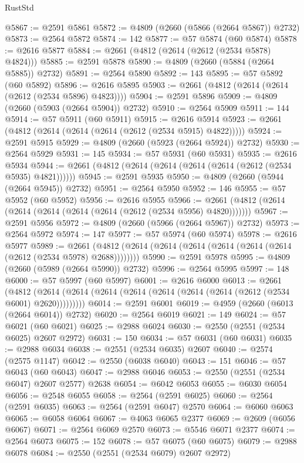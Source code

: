 \begin{lexlean}{RustStd}
\begin{coremodule}
@5867 := @2591 @5861
@5872 := @4809 (@2660 (@5866 (@2664 @5867)) @2732)
@5873 := @2564 @5872
@5874 := 142
@5877 := @57 @5874 (@60 @5874)
@5878 := @2616 @5877
@5884 := @2661 (@4812 (@2614 (@2612 (@2534 @5878) @4824)))
@5885 := @2591 @5878
@5890 := @4809 (@2660 (@5884 (@2664 @5885)) @2732)
@5891 := @2564 @5890
@5892 := 143
@5895 := @57 @5892 (@60 @5892)
@5896 := @2616 @5895
@5903 := @2661 (@4812 (@2614 (@2614 (@2612 (@2534 @5896) @4823))))
@5904 := @2591 @5896
@5909 := @4809 (@2660 (@5903 (@2664 @5904)) @2732)
@5910 := @2564 @5909
@5911 := 144
@5914 := @57 @5911 (@60 @5911)
@5915 := @2616 @5914
@5923 := @2661 (@4812 (@2614 (@2614 (@2614 (@2612 (@2534 @5915) @4822)))))
@5924 := @2591 @5915
@5929 := @4809 (@2660 (@5923 (@2664 @5924)) @2732)
@5930 := @2564 @5929
@5931 := 145
@5934 := @57 @5931 (@60 @5931)
@5935 := @2616 @5934
@5944 := @2661 (@4812 (@2614 (@2614 (@2614 (@2614 (@2612 (@2534 @5935) @4821))))))
@5945 := @2591 @5935
@5950 := @4809 (@2660 (@5944 (@2664 @5945)) @2732)
@5951 := @2564 @5950
@5952 := 146
@5955 := @57 @5952 (@60 @5952)
@5956 := @2616 @5955
@5966 := @2661 (@4812 (@2614 (@2614 (@2614 (@2614 (@2614 (@2612 (@2534 @5956) @4820)))))))
@5967 := @2591 @5956
@5972 := @4809 (@2660 (@5966 (@2664 @5967)) @2732)
@5973 := @2564 @5972
@5974 := 147
@5977 := @57 @5974 (@60 @5974)
@5978 := @2616 @5977
@5989 := @2661 (@4812 (@2614 (@2614 (@2614 (@2614 (@2614 (@2614 (@2612 (@2534 @5978) @2688))))))))
@5990 := @2591 @5978
@5995 := @4809 (@2660 (@5989 (@2664 @5990)) @2732)
@5996 := @2564 @5995
@5997 := 148
@6000 := @57 @5997 (@60 @5997)
@6001 := @2616 @6000
@6013 := @2661
    (@4812 (@2614 (@2614 (@2614 (@2614 (@2614 (@2614 (@2614 (@2612 (@2534 @6001) @2620)))))))))
@6014 := @2591 @6001
@6019 := @4959 (@2660 (@6013 (@2664 @6014)) @2732)
@6020 := @2564 @6019
@6021 := 149
@6024 := @57 @6021 (@60 @6021)
@6025 := @2988 @6024
@6030 := @2550 (@2551 (@2534 @6025) @2607 @2972)
@6031 := 150
@6034 := @57 @6031 (@60 @6031)
@6035 := @2988 @6034
@6038 := @2551 (@2534 @6035) @2607
@6040 := @2574 (@2575 @1147)
@6042 := @2550 (@6038 @6040)
@6043 := 151
@6046 := @57 @6043 (@60 @6043)
@6047 := @2988 @6046
@6053 := @2550 (@2551 (@2534 @6047) @2607 @2577) @2638
@6054 := @6042 @6053
@6055 := @6030 @6054
@6056 := @2548 @6055
@6058 := @2564 (@2591 @6025)
@6060 := @2564 (@2591 @6035)
@6063 := @2564 (@2591 @6047) @2570
@6064 := @6060 @6063
@6065 := @6058 @6064
@6067 := @4063 @6065 @2377
@6069 := @2609 (@6056 @6067)
@6071 := @2564 @6069 @2570
@6073 := @5546 @6071 @2377
@6074 := @2564 @6073
@6075 := 152
@6078 := @57 @6075 (@60 @6075)
@6079 := @2988 @6078
@6084 := @2550 (@2551 (@2534 @6079) @2607 @2972)

\end{coremodule}
\end{lexlean}
